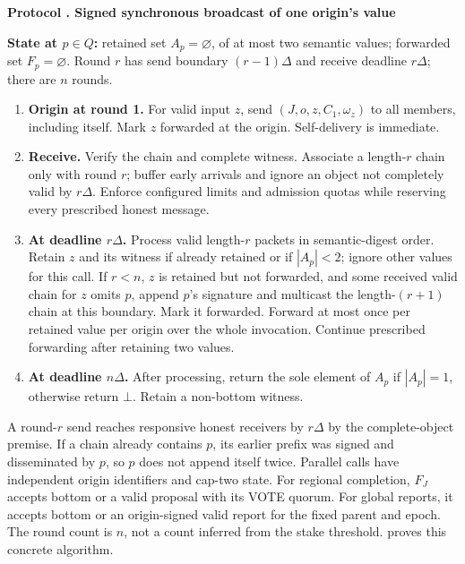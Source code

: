 \documentclass[11pt,a4paper,onecolumn]{article}
\newcommand{\botv}{\bot}
\theoremstyle{remark}\newtheorem{example}[definition]{Example}
\newcounter{protocol}
\newenvironment{protocol}[2]{\refstepcounter{protocol}\label{#1}\begin{mdframed}[nobreak=true,linewidth=.6pt,skipabove=10pt,skipbelow=10pt,innertopmargin=8pt,innerbottommargin=8pt]\small\raggedright\noindent\textbf{Protocol \theprotocol. #2}\par\smallskip}{\end{mdframed}}
\begin{document}
\begin{protocol}{alg:ab}{Signed synchronous broadcast of one origin's value}
\textbf{State at $p\in Q$:} retained set $A_p=\varnothing$, of at most two
semantic values; forwarded set $F_p=\varnothing$. Round $r$ has send boundary
$(r-1)\Delta$ and receive deadline $r\Delta$; there are $n$ rounds.
\begin{enumerate}[label=\textbf{A\arabic*.}]
\item \textbf{Origin at round 1.} For valid input $z$, send
$(J,o,z,C_1,\omega_z)$ to all members, including itself. Mark $z$ forwarded
at the origin. Self-delivery is immediate.
\item \textbf{Receive.} Verify the chain and complete witness. Associate a
length-$r$ chain only with round $r$; buffer early arrivals and ignore an object
not completely valid by $r\Delta$. Enforce configured limits and admission
quotas while reserving every prescribed honest message.
\item \textbf{At deadline $r\Delta$.} Process valid length-$r$ packets in
semantic-digest order. Retain $z$ and its witness if already retained or if
$|A_p|<2$; ignore other values for this call. If $r<n$, $z$ is retained but not
forwarded, and some received valid chain for $z$ omits $p$, append $p$'s signature
and multicast the length-$(r+1)$ chain at this boundary. Mark it forwarded.
Forward at most once per retained value per origin over the whole invocation.
Continue prescribed forwarding after retaining two values.
\item \textbf{At deadline $n\Delta$.} After processing, return the sole element
of $A_p$ if $|A_p|=1$, otherwise return $\botv$. Retain a non-bottom witness.
\end{enumerate}
\end{protocol}

A round-$r$ send reaches responsive honest receivers by $r\Delta$ by the
complete-object premise. If a chain already contains $p$, its earlier prefix
was signed and disseminated by $p$, so $p$ does not append itself twice.
Parallel calls have independent origin identifiers and cap-two state. For
regional completion, $F_J$ accepts bottom or a valid proposal with its VOTE
quorum. For global reports, it accepts bottom or an origin-signed valid report
for the fixed parent and epoch. The round count is $n$, not a count inferred
from the stake threshold.  proves this concrete algorithm.
\end{document}
